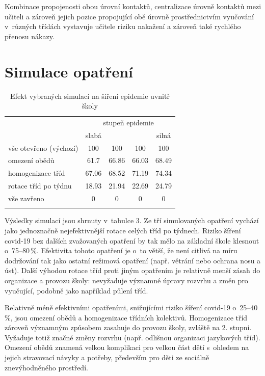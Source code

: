 Kombinace propojenosti obou úrovní kontaktů, centralizace úrovně kontaktů mezi učiteli a zároveň jejich pozice propojující obě úrovně prostřednictvím vyučování v~různých třídách vystavuje učitele riziku nakažení a zároveň také rychlého přenosu nákazy. 

    
\section*{Simulace opatření} 

\begin{table}
    \centering
    \caption{Efekt vybraných simulací na šíření epidemie uvnitř školy}
\begin{tabular}{lcccc}
\hline
                       & \multicolumn{4}{c}{stupeň epidemie} \\ 
                       & slabá   &         &        & silná  \\ \hline
vše otevřeno (výchozí) & 100     & 100     & 100    & 100    \\
omezení obědů          & 61.7    & 66.86   & 66.03  & 68.49  \\
homogenizace tříd      & 67.06   & 68.52   & 71.19  & 74.34  \\
rotace tříd po týdnu   & 18.93   & 21.94   & 22.69  & 24.79  \\
vše zavřeno            & 0       & 0       & 0      & 0      \\ \hline
\label{tab:100-sims}
\end{tabular}
\end{table}

Výsledky simulací jsou shrnuty v~tabulce 3. Ze tří simulovaných opatření vychází jako jednoznačně nejefektivnější rotace celých tříd po týdnech. Riziko šíření covid-19 bez dalších zvažovaných opatření by tak mělo na základní škole klesnout o~75--80\,\%. Efektivita tohoto opatření je o~to větší, že není citlivá na míru dodržování tak jako ostatní režimová opatření (např. větrání nebo ochrana nosu a úst). Další výhodou rotace tříd proti jiným opatřením je relativně menší zásah do organizace a provozu školy: nevyžaduje významné úpravy rozvrhu a změn pro vyučující, podobně jako například půlení tříd.

Relativně méně efektivními opatřeními, snižujícími riziko šíření covid-19 o~25--40\,\%, jsou omezení obědů a homogenizace třídních kolektivů. Homogenizace tříd zároveň významným způsobem zasahuje do provozu školy, zvláště na 2. stupni. Vyžaduje totiž značné změny rozvrhu (např. odlišnou organizaci jazykových tříd). Omezení obědů znamená velkou komplikaci pro velkou část dětí s~ohledem na jejich stravovací návyky a potřeby, především pro děti ze sociálně znevýhodněného prostředí.


